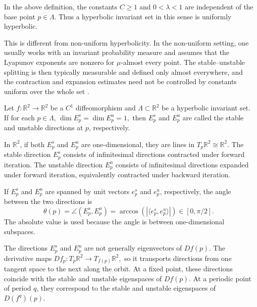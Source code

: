\begin{remark}
In the above definition, the constants \(C\geq 1\) and \(0<\lambda<1\) are independent of the base point \(p\in\Lambda\). Thus a hyperbolic invariant set in this sense is uniformly hyperbolic.

This is different from non-uniform hyperbolicity. In the non-uniform setting, one usually works with an invariant probability measure and assumes that the Lyapunov exponents are nonzero for \(\mu\)-almost every point. The stable--unstable splitting is then typically measurable and defined only almost everywhere, and the contraction and expansion estimates need not be controlled by constants uniform over the whole set \cite{EckmannRuelle1985,Barreira2012}.
\end{remark}


\begin{definition}
Let \(f:\mathbb R^2\to\mathbb R^2\) be a \(C^1\) diffeomorphism and
\(\Lambda\subset\mathbb R^2\) be a hyperbolic invariant set. If for each \(p\in\Lambda\),
\(
\dim E_p^s=\dim E_p^u=1,
\)
then \(E_p^s\) and \(E_p^u\) are called the stable and unstable directions at
\(p\), respectively.


\end{definition}

In \(\mathbb R^2\), if both \(E_p^s\) and \(E_p^u\) are one-dimensional, they are lines in \(T_p\mathbb R^2\cong \mathbb R^2.\)
The stable direction \(E_p^s\) consists of infinitesimal directions contracted under forward iteration. The unstable direction \(E_p^u\) consists of infinitesimal directions expanded under forward iteration, equivalently contracted under backward iteration.

If \(E_p^s\) and \(E_p^u\) are spanned by unit vectors \(e_p^s\) and \(e_p^u\), respectively, the angle between the two directions is
\[
\theta(p)
=
\angle(E_p^s,E_p^u)
=
\arccos\left(\left|\langle e_p^s,e_p^u\rangle\right|\right)
\in [0,\pi/2].
\]
The absolute value is used because the angle is between one-dimensional subspaces.


\begin{remark}
The directions \(E_p^s\) and \(E_p^u\) are not generally eigenvectors of \(Df(p)\). The derivative maps
\(
Df_p:T_p\mathbb R^2\to T_{f(p)}\mathbb R^2,
\)
so it transports directions from one tangent space to the next along the orbit. At a fixed point, these directions coincide with the stable and unstable eigenspaces of \(Df(p)\). At a periodic point of period \(q\), they correspond to the stable and unstable eigenspaces of \(D(f^q)(p)\).
\end{remark}

